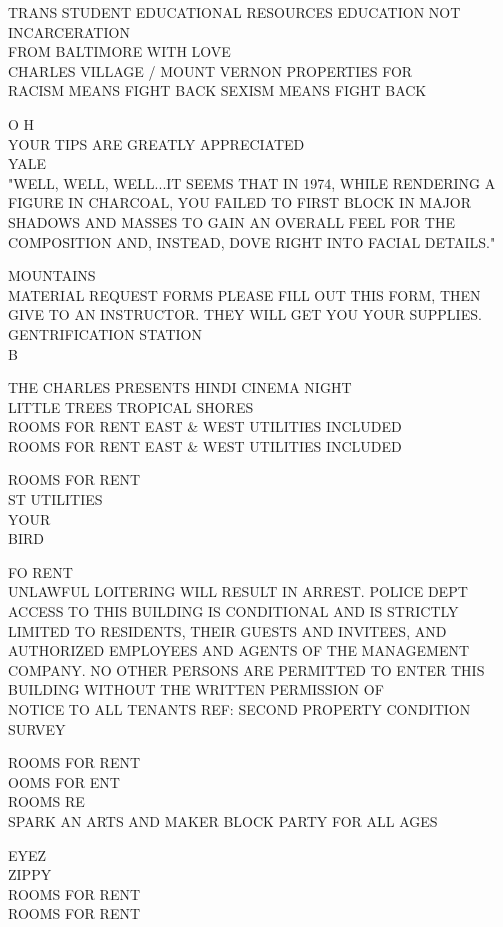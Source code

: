 \documentclass[10pt,letterpaper]{article}
\begin{document}
TRANS STUDENT EDUCATIONAL RESOURCES EDUCATION NOT INCARCERATION\\
FROM BALTIMORE WITH LOVE\\
CHARLES VILLAGE / MOUNT VERNON PROPERTIES FOR\\
RACISM MEANS FIGHT BACK SEXISM MEANS FIGHT BACK

O H\\
YOUR TIPS ARE GREATLY APPRECIATED\\
YALE\\
"WELL, WELL, WELL...IT SEEMS THAT IN 1974, WHILE RENDERING A FIGURE IN CHARCOAL, YOU FAILED TO FIRST BLOCK IN MAJOR SHADOWS AND MASSES TO GAIN AN OVERALL FEEL FOR THE COMPOSITION AND, INSTEAD, DOVE RIGHT INTO FACIAL DETAILS."

MOUNTAINS\\
MATERIAL REQUEST FORMS PLEASE FILL OUT THIS FORM, THEN GIVE TO AN INSTRUCTOR.  THEY WILL GET YOU YOUR SUPPLIES.\\
GENTRIFICATION STATION\\
B

THE CHARLES PRESENTS HINDI CINEMA NIGHT\\
LITTLE TREES TROPICAL SHORES\\
ROOMS FOR RENT EAST \& WEST UTILITIES INCLUDED\\
ROOMS FOR RENT EAST \& WEST UTILITIES INCLUDED

ROOMS FOR RENT\\
ST UTILITIES\\
YOUR\\
BIRD

FO RENT\\
UNLAWFUL LOITERING WILL RESULT IN ARREST.  POLICE DEPT\\
ACCESS TO THIS BUILDING IS CONDITIONAL AND IS STRICTLY LIMITED TO RESIDENTS, THEIR GUESTS AND INVITEES, AND AUTHORIZED EMPLOYEES AND AGENTS OF THE MANAGEMENT COMPANY.  NO OTHER PERSONS ARE PERMITTED TO ENTER THIS BUILDING WITHOUT THE WRITTEN PERMISSION OF\\
NOTICE TO ALL TENANTS REF: SECOND PROPERTY CONDITION SURVEY

ROOMS FOR RENT\\
OOMS FOR ENT\\
ROOMS RE\\
SPARK AN ARTS AND MAKER BLOCK PARTY FOR ALL AGES

EYEZ\\
ZIPPY\\
ROOMS FOR RENT\\
ROOMS FOR RENT
\end{document}
